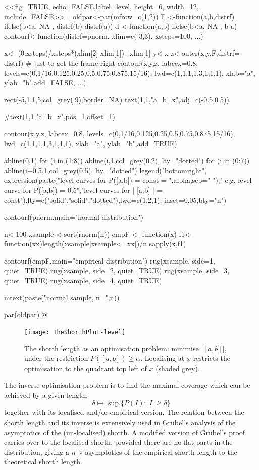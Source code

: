 \documentclass[dvips,12pt,a4paper,twoside]{amsart}
\begin{document}
<<fig=TRUE, echo=FALSE,label=level, height=6, width=12, include=FALSE>>=
oldpar<-par(mfrow=c(1,2))
F <-function(a,b,distrf){ ifelse(b<a, NA , distrf(b)-distrf(a))}
d <-function(a,b){ ifelse(b<a, NA , b-a)}
contourf<-function(distrf=pnorm, xlim=c(-3,3), xsteps=100, ...){
	x<- (0:xsteps)/xsteps*(xlim[2]-xlim[1])+xlim[1]
	y<-x
	z<-outer(x,y,F,distrf= distrf)
	# just to get the frame right
	contour(x,y,z,
	labcex=0.8,
	levels=c(0,1/16,0.125,0.25,0.5,0.75,0.875,15/16),
	lwd=c(1,1,1,1,3,1,1,1),
	xlab="a", ylab="b",add=FALSE, ...)

	

	rect(-5,1,1,5,col=grey(.9),border=NA)
	text(1,1,"a=b=x",adj=c(-0.5,0.5))
	
	#text(1,1,"a=b=x",pos=1,offset=1)
	
	contour(x,y,z,
	labcex=0.8,
	levels=c(0,1/16,0.125,0.25,0.5,0.75,0.875,15/16),
	lwd=c(1,1,1,1,3,1,1,1),
	xlab="a", ylab="b",add=TRUE)
	
	
	abline(0,1)
	for (i in (1:8)) abline(i,1,col=grey(0.2), lty="dotted")
	for (i in (0:7)) abline(i+0.5,1,col=grey(0.5), lty="dotted")
legend("bottomright", expression(paste("level curves for P([a,b]) = const = ",alpha,sep=" "),"    e.g. level curve for P([a,b]) = 0.5","level curves for | [a,b] | = const"),lty=c("solid","solid","dotted"),lwd=c(1,2,1), inset=0.05,bty="n")
	}
	
contourf(pnorm,main="normal distribution")

n<-100
xsample <-sort(rnorm(n))
empF <- function(x){
	f1<-function(xx){length(xsample[xsample<=xx])/n}
	sapply(x,f1)}

contourf(empF,main="empirical distribution")
rug(xsample, side=1, quiet=TRUE)
rug(xsample, side=2, quiet=TRUE)
rug(xsample, side=3, quiet=TRUE)
rug(xsample, side=4, quiet=TRUE)

mtext(paste("normal sample, n=",n))

par(oldpar)
@
\begin{figure}[htb]
\texttt{[image: TheShorthPlot-level]}
\caption{The shorth length as an optimisation problem: minimise $| [a,b] |,$ 
under the restriction $P([a,b] ) \geq \alpha$. Localising at $x$ restricts the optimisation  to the quadrant top left of $x$ (shaded grey).}
\label{fig:level}
\end{figure}

The inverse optimisation problem is to find the maximal coverage which can be achieved by a given length:
$$
\delta \longmapsto \sup  \{P(I): | I | \geq \delta \}
$$
together with its localised and/or empirical version.
%
The relation between the shorth length and its inverse is extensively used in Gr\"ubel's analysis of the asymptotics  of the (un-localised) shorth. A modified version of Gr\"ubel's proof carries over to the localised shorth, provided there are no flat parts in the distribution, giving a  $n^{-\frac{1}{2}}$ asymptotics of the empirical shorth length to the theoretical shorth length.
\end{document}
